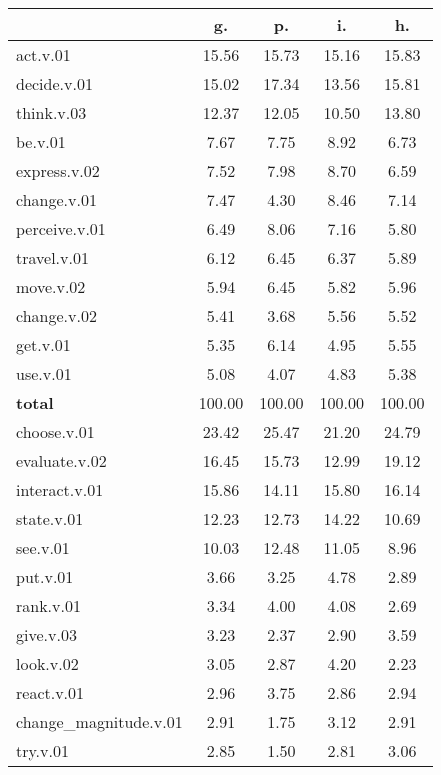 \begin{table}[h!]
\begin{center}
\begin{tabular}{| l || c | c | c | c |}\hline
 & {\bf g.} & {\bf p.} & {\bf i.} & {\bf h.} \\\hline\hline
act.v.01 & 15.56  & 15.73  & 15.16  & 15.83 \\\hline
decide.v.01 & 15.02  & 17.34  & 13.56  & 15.81 \\\hline
think.v.03 & 12.37  & 12.05  & 10.50  & 13.80 \\\hline
be.v.01 & 7.67  & 7.75  & 8.92  & 6.73 \\\hline
express.v.02 & 7.52  & 7.98  & 8.70  & 6.59 \\\hline
change.v.01 & 7.47  & 4.30  & 8.46  & 7.14 \\\hline
perceive.v.01 & 6.49  & 8.06  & 7.16  & 5.80 \\\hline
travel.v.01 & 6.12  & 6.45  & 6.37  & 5.89 \\\hline
move.v.02 & 5.94  & 6.45  & 5.82  & 5.96 \\\hline
change.v.02 & 5.41  & 3.68  & 5.56  & 5.52 \\\hline
get.v.01 & 5.35  & 6.14  & 4.95  & 5.55 \\\hline
use.v.01 & 5.08  & 4.07  & 4.83  & 5.38 \\\hline\hline
{{\bf total}} & 100.00  & 100.00  & 100.00  & 100.00 \\\hline\hline\hline
choose.v.01 & 23.42  & 25.47  & 21.20  & 24.79 \\\hline
evaluate.v.02 & 16.45  & 15.73  & 12.99  & 19.12 \\\hline
interact.v.01 & 15.86  & 14.11  & 15.80  & 16.14 \\\hline
state.v.01 & 12.23  & 12.73  & 14.22  & 10.69 \\\hline
see.v.01 & 10.03  & 12.48  & 11.05  & 8.96 \\\hline
put.v.01 & 3.66  & 3.25  & 4.78  & 2.89 \\\hline
rank.v.01 & 3.34  & 4.00  & 4.08  & 2.69 \\\hline
give.v.03 & 3.23  & 2.37  & 2.90  & 3.59 \\\hline
look.v.02 & 3.05  & 2.87  & 4.20  & 2.23 \\\hline
react.v.01 & 2.96  & 3.75  & 2.86  & 2.94 \\\hline
change\_magnitude.v.01 & 2.91  & 1.75  & 3.12  & 2.91 \\\hline
try.v.01 & 2.85  & 1.50  & 2.81  & 3.06 \\\hline\hline

\end{tabular}
\end{center}
\end{table}
